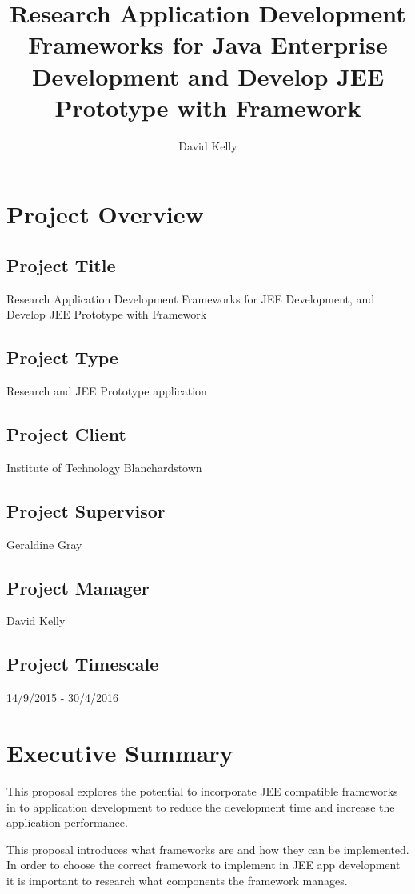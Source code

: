\documentclass[]{report}
\title{Research Application Development Frameworks for Java Enterprise Development \newline and Develop JEE Prototype with Framework}
\author{David Kelly}
\begin{document}
\maketitle

\newpage

\section{Project Overview}

	\subsection{Project Title}
	Research Application Development Frameworks for JEE Development, and Develop JEE Prototype with Framework
	
	\subsection{Project Type}
	Research and JEE Prototype application
	
	\subsection{Project Client}
	Institute of Technology Blanchardstown
	
	\subsection{Project Supervisor}
	Geraldine Gray
	
	\subsection{Project Manager}
	David Kelly
	
	\subsection{Project Timescale}
	14/9/2015 - 30/4/2016

	\section{Executive Summary}
	This proposal explores the potential to incorporate JEE compatible frameworks in to application development to reduce the development time and increase the application performance. 
	
	This proposal introduces what frameworks are and how they can be implemented. In order to choose the correct framework to implement in JEE app development it is important to research what components the framework manages.
	
\end{document}

